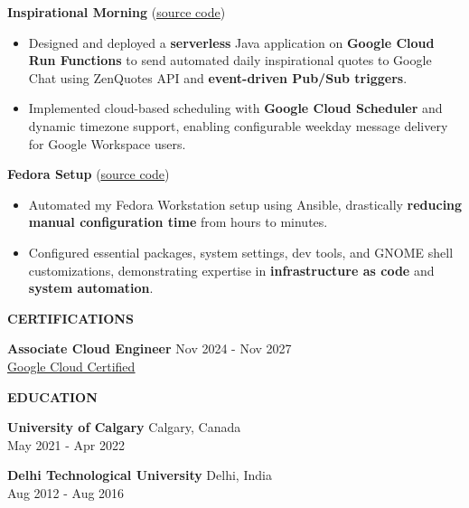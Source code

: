 \documentclass[a4paper]{article}
\newcommand{\header} [1] {
    \vspace{6pt}
    {\hspace*{-18pt} \textcolor{Accent}{\large\textbf{\MakeUppercase{#1}}}}
    \vspace{-7pt} \\
    {\color{Accent}\hspace*{-18pt} \hrulefill \hspace*{-7pt}}
}
\newcommand{\resumeHeadingProject}[3]{
    {\textbf{#1}} (\href{#2}{\uline{source code}})
    \vspace{-5pt}
}
\newcommand{\resumeItemProject}[1]{
  \item{
    \begin{justify}
    \setlength{\rightskip}{0.15in} {{\fontsize{9.0pt}{11pt}\selectfont #1} \vspace{-4pt}}
    \end{justify}
  }
}
\newcommand{\resumeHeadingEducation}[4]{
    \textbf{#1} \hfill {#2}\\
    {\fontsize{9.0pt}{11pt}\selectfont {#3}} \hfill {#4}\\
    \vspace{5pt}
}
\begin{document}
\resumeHeadingProject {Inspirational Morning} {https://github.com/zbhavyai/inspirational-morning} {Jun 2024 - Jun 2024}
\begin{itemize}
    \resumeItemProject {Designed and deployed a \textbf{serverless} Java application on \textbf{Google Cloud Run Functions} to send automated daily inspirational quotes to Google Chat using ZenQuotes API and \textbf{event-driven Pub/Sub triggers}.}
    \resumeItemProject {Implemented cloud-based scheduling with \textbf{Google Cloud Scheduler} and dynamic timezone support, enabling configurable weekday message delivery for Google Workspace users.}
\end{itemize}

\resumeHeadingProject {Fedora Setup} {https://github.com/zbhavyai/fedora-setup} {May 2025 - May 2025}
\begin{itemize}
    \resumeItemProject {Automated my Fedora Workstation setup using Ansible, drastically \textbf{reducing manual configuration time} from hours to minutes.}
    \resumeItemProject {Configured essential packages, system settings, dev tools, and GNOME shell customizations, demonstrating expertise in \textbf{infrastructure as code} and \textbf{system automation}.}
\end{itemize}
\vspace{3pt}

\header{Certifications}

\textbf{Associate Cloud Engineer} \hfill Nov 2024 - Nov 2027\\
{\fontsize{9.0pt}{11pt}\selectfont \href{https://www.credly.com/badges/52bb681c-f535-47e7-b669-78e9b4d7c4a0}{\uline{Google Cloud Certified}}}
\vspace{4pt}


\header{Education}

\resumeHeadingEducation {University of Calgary} {Calgary, Canada} {MEng Software Engineering} {May 2021 - Apr 2022}
\resumeHeadingEducation {Delhi Technological University} {Delhi, India} {BTech Electronics and Communication} {Aug 2012 - Aug 2016}


\end{document}
